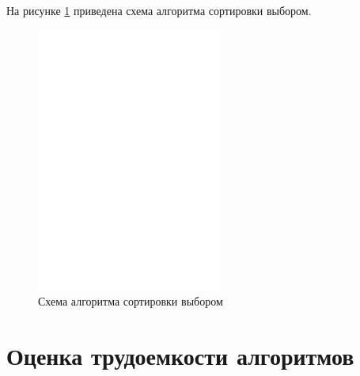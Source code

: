 \newpage

На рисунке \ref{pic:selectionsort} приведена схема алгоритма сортировки выбором.

\begin{figure}[H]
	\centering
	\includegraphics[scale=0.62]{assets/selectionsort.pdf}
	\caption{Схема алгоритма сортировки выбором}
	\label{pic:selectionsort}
\end{figure}

\newpage


\section{Оценка трудоемкости алгоритмов}

